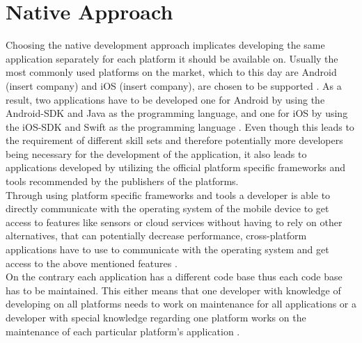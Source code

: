 \documentclass[Bachelor,BIF,english]{twbook}
\begin{document}
\section{Native Approach}
Choosing the native development approach implicates developing the same application separately for each platform it should be available on. Usually the most commonly used platforms on the market, which to this day are Android (insert company) and iOS (insert company), are chosen to be supported \cite[p.~5]{Steczko2016}. As a result, two applications have to be developed one for Android by using the Android-SDK and Java as the programming language, and one for iOS by using the iOS-SDK and Swift as the programming language \cite[p.~5]{LinckArne2016} \cite{AppleGettingStarted}. Even though this leads to the requirement of different skill sets and therefore potentially more developers being necessary for the development of the application, it also leads to applications developed by utilizing the official platform specific frameworks and tools recommended by the publishers of the platforms. 
\\[\baselineskip]
Through using platform specific frameworks and tools a developer is able to directly communicate with the operating system of the mobile device to get access to features like sensors or cloud services without having to rely on other alternatives, that can potentially decrease performance, cross-platform applications have to use to communicate with the operating system and get access to the above mentioned features \cite[p.~6]{LinckArne2016}.
\\[\baselineskip]
On the contrary each application has a different code base thus each code base has to be maintained. This either means that one developer with knowledge of developing on all platforms needs to work on maintenance for all applications or a developer with special knowledge regarding one platform works on the maintenance of each particular platform's application \cite[p.~6]{LinckArne2016}.
\end{document}
